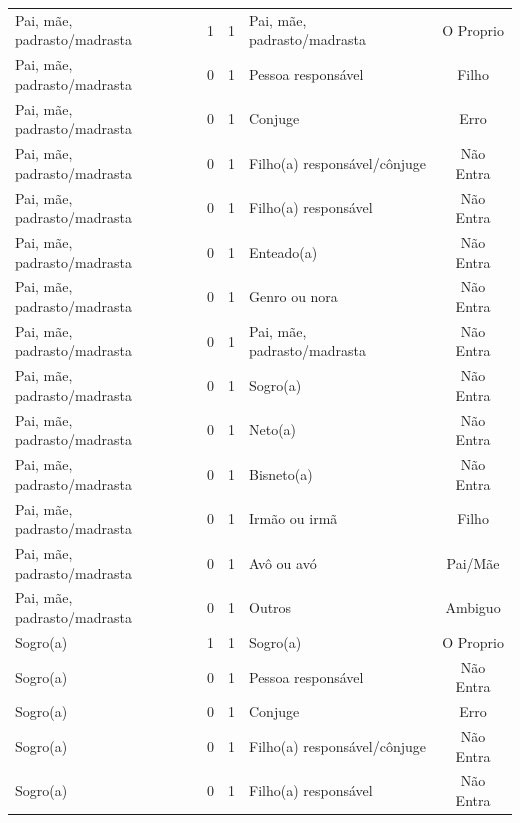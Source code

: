 \documentclass[
	12pt,				%
	openright,			%
	twoside,			%
	a4paper,			%
	english,			%
	french,				%
	spanish,			%
	brazil				%
	]{abntex2}
\begin{document}
\begin{anexosenv}
\begin{longtable}{@{}lcclc@{}}
Pai, mãe, padrasto/madrasta  & 1         & 1        & Pai, mãe, padrasto/madrasta  & O Proprio       \\
Pai, mãe, padrasto/madrasta  & 0         & 1        & Pessoa responsável           & Filho           \\
Pai, mãe, padrasto/madrasta  & 0         & 1        & Conjuge                      & Erro            \\
Pai, mãe, padrasto/madrasta  & 0         & 1        & Filho(a) responsável/cônjuge & Não Entra       \\
Pai, mãe, padrasto/madrasta  & 0         & 1        & Filho(a) responsável         & Não Entra       \\
Pai, mãe, padrasto/madrasta  & 0         & 1        & Enteado(a)                   & Não Entra       \\
Pai, mãe, padrasto/madrasta  & 0         & 1        & Genro ou nora                & Não Entra       \\
Pai, mãe, padrasto/madrasta  & 0         & 1        & Pai, mãe, padrasto/madrasta  & Não Entra       \\
Pai, mãe, padrasto/madrasta  & 0         & 1        & Sogro(a)                     & Não Entra       \\
Pai, mãe, padrasto/madrasta  & 0         & 1        & Neto(a)                      & Não Entra       \\
Pai, mãe, padrasto/madrasta  & 0         & 1        & Bisneto(a)                   & Não Entra       \\
Pai, mãe, padrasto/madrasta  & 0         & 1        & Irmão ou irmã                & Filho           \\
Pai, mãe, padrasto/madrasta  & 0         & 1        & Avô ou avó                   & Pai/Mãe         \\
Pai, mãe, padrasto/madrasta  & 0         & 1        & Outros                       & Ambiguo         \\
Sogro(a)                     & 1         & 1        & Sogro(a)                     & O Proprio       \\
Sogro(a)                     & 0         & 1        & Pessoa responsável           & Não Entra       \\
Sogro(a)                     & 0         & 1        & Conjuge                      & Erro            \\
Sogro(a)                     & 0         & 1        & Filho(a) responsável/cônjuge & Não Entra       \\
Sogro(a)                     & 0         & 1        & Filho(a) responsável         & Não Entra       \\

\end{longtable}
\end{anexosenv}
\end{document}

